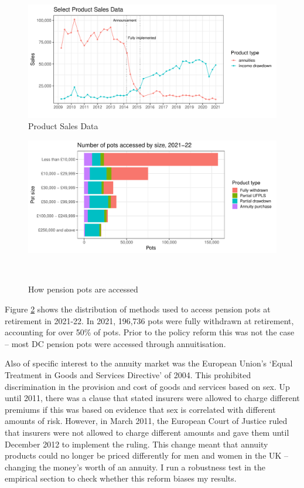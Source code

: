 \documentclass[12pt]{article}
\begin{document}
\begin{figure}[h]

    \centering
    \includegraphics[width=0.9\columnwidth]{figures/annuity_overtime.pdf}

    \caption{Product Sales Data}
    \label{fig:annovertime}
\end{figure}

\begin{figure}[h]

    \centering
    \includegraphics[width=0.9\columnwidth]{figures/annuity_pot_sizes.pdf}
    \caption[Caption for LOF]{How pension pots are accessed\protect\footnotemark}
    \label{fig:ann2122}

    \
\end{figure}
Figure \ref{fig:ann2122} shows the distribution of methods used to access pension pots
at retirement in 2021-22. In 2021, 196,736 pots were fully withdrawn at
retirement, accounting for over 50\% of pots. Prior to the policy reform this
was not the case -- most DC pension pots were accessed through
annuitisation.

Also of specific interest to the annuity market was the European Union's `Equal
Treatment in Goods and Services Directive' of 2004. This prohibited
discrimination in the provision and cost of goods and services based on sex. Up
until 2011, there was a clause that stated insurers were allowed to charge
different premiums if this was based on evidence that sex is correlated with
different amounts of risk. However, in March 2011, the European Court of Justice
ruled that insurers were not allowed to charge different amounts and gave them
until December 2012 to implement the ruling. This change meant that annuity
products could no longer be priced differently for men and women in the UK --
changing the money's worth of an annuity. I run a robustness test in the
empirical section to check whether this reform biases my results.
\end{document}
